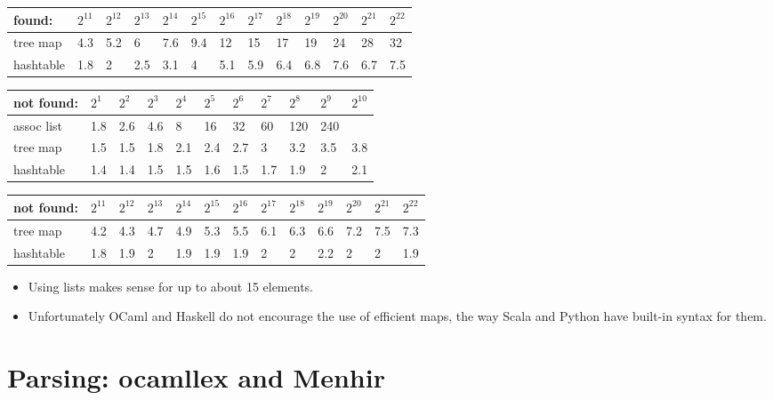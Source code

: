 \documentclass{beamer}
\begin{document}
\begin{tabular}{|l|l|l|l|l|l|l|l|l|l|l|l|l|}
  \hline
  found: & $2^{11}$ & $2^{12}$ & $2^{13}$ & $2^{14}$ & $2^{15}$ & $2^{16}$ &
  $2^{17}$ & $2^{18}$ & $2^{19}$ & $2^{20}$ & $2^{21}$ & $2^{22}$\\
  \hline
  tree map & 4.3 & 5.2 & 6 & 7.6 & 9.4 & 12 & 15 & 17 & 19 & 24 & 28 & 32\\
  \hline
  hashtable & 1.8 & 2 & 2.5 & 3.1 & 4 & 5.1 & 5.9 & 6.4 & 6.8 & 7.6 & 6.7 &
  7.5\\
  \hline
\end{tabular}

{\small{\begin{tabular}{|l|l|l|l|l|l|l|l|l|l|l|}
  \hline
  not found: & $2^1$ & $2^2$ & $2^3$ & $2^4$ & $2^5$ & $2^6$ & $2^7$ & $2^8$ &
  $2^9$ & $2^{10}$\\
  \hline
  assoc list & 1.8 & 2.6 & 4.6 & 8 & 16 & 32 & 60 & 120 & 240 & \\
  \hline
  tree map & 1.5 & 1.5 & 1.8 & 2.1 & 2.4 & 2.7 & 3 & 3.2 & 3.5 & 3.8\\
  \hline
  hashtable & 1.4 & 1.4 & 1.5 & 1.5 & 1.6 & 1.5 & 1.7 & 1.9 & 2 & 2.1\\
  \hline
\end{tabular}

\begin{tabular}{|l|l|l|l|l|l|l|l|l|l|l|l|l|}
  \hline
  not found: & $2^{11}$ & $2^{12}$ & $2^{13}$ & $2^{14}$ & $2^{15}$ & $2^{16}$
  & $2^{17}$ & $2^{18}$ & $2^{19}$ & $2^{20}$ & $2^{21}$ & $2^{22}$\\
  \hline
  tree map & 4.2 & 4.3 & 4.7 & 4.9 & 5.3 & 5.5 & 6.1 & 6.3 & 6.6 & 7.2 & 7.5 &
  7.3\\
  \hline
  hashtable & 1.8 & 1.9 & 2 & 1.9 & 1.9 & 1.9 & 2 & 2 & 2.2 & 2 & 2 & 1.9\\
  \hline
\end{tabular}}}
\begin{itemize}
  \item Using lists makes sense for up to about 15 elements.
  
  \item Unfortunately OCaml and Haskell do not encourage the use of efficient
  maps, the way Scala and Python have built-in syntax for them.
\end{itemize}

\section{Parsing: ocamllex and Menhir}
\end{document}
